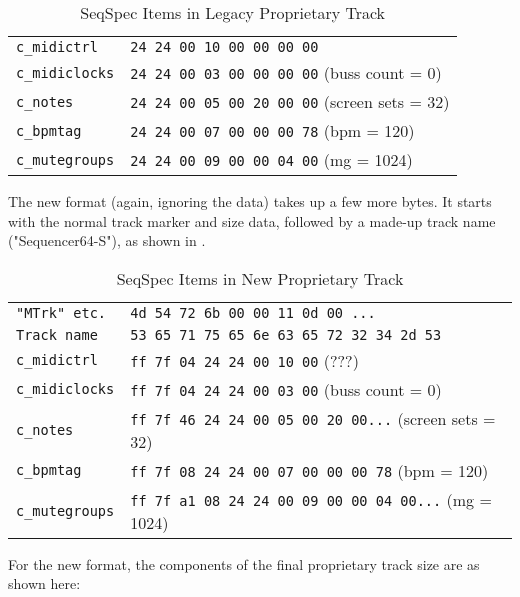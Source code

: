    \begin{table}[htb]
      \centering
      \caption{SeqSpec Items in Legacy Proprietary Track}
      \label{table:seqspec_items_legacy_track}
      \begin{tabular}{l l}
\texttt{c\_midictrl}    & \texttt{24 24 00 10 00 00 00 00} \\
\texttt{c\_midiclocks}  & \texttt{24 24 00 03 00 00 00 00} (buss count = 0) \\
\texttt{c\_notes}       & \texttt{24 24 00 05 00 20 00 00} (screen sets = 32) \\
\texttt{c\_bpmtag}      & \texttt{24 24 00 07 00 00 00 78} (bpm = 120) \\
\texttt{c\_mutegroups}  & \texttt{24 24 00 09 00 00 04 00} (mg = 1024) \\
      \end{tabular}
   \end{table}

   The new format (again, ignoring the data) takes up a few more bytes.
   It starts with the normal track marker and size data, followed by a
   made-up track name ("Sequencer64-S"),
   as shown in .

   \begin{table}[htb]
      \centering
      \caption{SeqSpec Items in New Proprietary Track}
      \label{table:seqspec_items_new_track}
      \begin{tabular}{l l}
\texttt{"MTrk" etc.}   & \texttt{4d 54 72 6b 00 00 11 0d 00 ...} \\
\texttt{Track name}    & \texttt{53 65 71 75 65 6e 63 65 72 32 34 2d 53} \\
\texttt{c\_midictrl}   & \texttt{ff 7f 04 24 24 00 10 00} (???) \\
\texttt{c\_midiclocks} & \texttt{ff 7f 04 24 24 00 03 00} (buss count = 0) \\
\texttt{c\_notes}      & \texttt{ff 7f 46 24 24 00 05 00 20 00...} (screen sets = 32) \\
\texttt{c\_bpmtag}     & \texttt{ff 7f 08 24 24 00 07 00 00 00 78} (bpm = 120) \\
\texttt{c\_mutegroups} & \texttt{ff 7f a1 08 24 24 00 09 00 00 04 00...} (mg = 1024) \\
      \end{tabular}
   \end{table}

For the new format, the components of the final proprietary track size are
as shown here:

